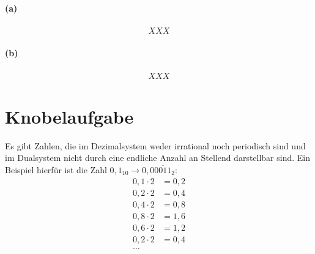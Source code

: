 \documentclass[a4paper]{article}
\begin{document}
\paragraph{(a)}
\begin{align*}
XXX
\end{align*}
\paragraph{(b)}
\begin{align*}
XXX
\end{align*}

\section{Knobelaufgabe}
Es gibt Zahlen, die im Dezimalsystem weder irrational noch periodisch sind und im Dualsystem nicht durch eine endliche Anzahl an Stellend darstellbar sind. Ein Beispiel hierfür ist die Zahl $0,1_{10} \rightarrow 0,0\overline{0011}_{2}$:
\begin{align*}
0,1 \cdot 2 &= 0,2 \\
0,2 \cdot 2 &= 0,4 \\
0,4 \cdot 2 &= 0,8 \\
0,8 \cdot 2 &= 1,6 \\
0,6 \cdot 2 &= 1,2 \\
0,2 \cdot 2 &= 0,4 \\
\text{\ldots}
\end{align*}
\end{document}
